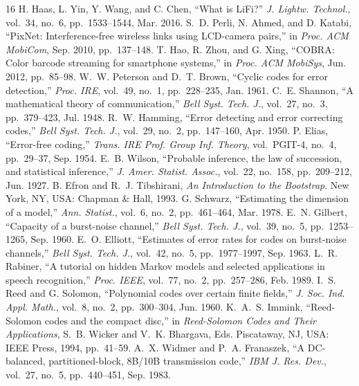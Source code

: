 \documentclass[conference,a4paper]{IEEEtran}
\begin{document}
\begin{thebibliography}{16}
\footnotesize
{} H. Haas, L. Yin, Y. Wang, and C. Chen, ``What is LiFi?'' \textit{J. Lightw.
Technol.}, vol.~34, no.~6, pp.~1533--1544, Mar. 2016.
 S.~D. Perli, N. Ahmed, and D. Katabi, ``PixNet: Interference-free wireless links
using LCD-camera pairs,'' in \textit{Proc. ACM MobiCom}, Sep. 2010, pp.~137--148.
 T. Hao, R. Zhou, and G. Xing, ``COBRA: Color barcode streaming for smartphone
systems,'' in \textit{Proc. ACM MobiSys}, Jun. 2012, pp.~85--98.
 W.~W. Peterson and D.~T. Brown, ``Cyclic codes for error detection,''
\textit{Proc. IRE}, vol.~49, no.~1, pp.~228--235, Jan. 1961.
 C.~E. Shannon, ``A mathematical theory of communication,'' \textit{Bell Syst.
Tech. J.}, vol.~27, no.~3, pp.~379--423, Jul. 1948.
 R.~W. Hamming, ``Error detecting and error correcting codes,'' \textit{Bell
Syst. Tech. J.}, vol.~29, no.~2, pp.~147--160, Apr. 1950.
 P. Elias, ``Error-free coding,'' \textit{Trans. IRE Prof. Group Inf. Theory},
vol.~PGIT-4, no.~4, pp.~29--37, Sep. 1954.
 E.~B. Wilson, ``Probable inference, the law of succession, and statistical
inference,'' \textit{J. Amer. Statist. Assoc.}, vol.~22, no.~158, pp.~209--212, Jun. 1927.
 B. Efron and R.~J. Tibshirani, \textit{An Introduction to the Bootstrap}. New York,
NY, USA: Chapman \& Hall, 1993.
 G. Schwarz, ``Estimating the dimension of a model,'' \textit{Ann. Statist.},
vol.~6, no.~2, pp.~461--464, Mar. 1978.
 E.~N. Gilbert, ``Capacity of a burst-noise channel,'' \textit{Bell Syst. Tech.
J.}, vol.~39, no.~5, pp.~1253--1265, Sep. 1960.
 E.~O. Elliott, ``Estimates of error rates for codes on burst-noise channels,''
\textit{Bell Syst. Tech. J.}, vol.~42, no.~5, pp.~1977--1997, Sep. 1963.
 L.~R. Rabiner, ``A tutorial on hidden Markov models and selected applications in
speech recognition,'' \textit{Proc. IEEE}, vol.~77, no.~2, pp.~257--286, Feb. 1989.
 I.~S. Reed and G. Solomon, ``Polynomial codes over certain finite fields,''
\textit{J. Soc. Ind. Appl. Math.}, vol.~8, no.~2, pp.~300--304, Jun. 1960.
 K.~A.~S. Immink, ``Reed-Solomon codes and the compact disc,'' in \textit{Reed-Solomon
Codes and Their Applications}, S.~B. Wicker and V.~K. Bhargava, Eds. Piscataway, NJ, USA: IEEE
Press, 1994, pp.~41--59.
 A.~X. Widmer and P.~A. Franaszek, ``A DC-balanced, partitioned-block, 8B/10B
transmission code,'' \textit{IBM J. Res. Dev.}, vol.~27, no.~5, pp.~440--451, Sep. 1983.
\end{thebibliography}
\end{document}
